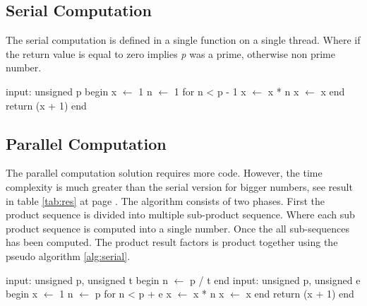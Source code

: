 \documentclass[12pt, oneside, onecolumn]{article}
\begin{document}
\subsection{Serial Computation}
The serial computation is defined in a single function on a single thread. Where if the return value is equal to zero implies \emph{p} was a prime, otherwise non prime number.
\begin{algorithm}[caption={Serial Computation.},label={alg:serial}]
input: unsigned p
begin
	x $\gets$ 1
	n $\gets$ 1
	for n < p - 1
		x $\gets$ x * n
		x $\gets$ x %
	end
	return (x + 1) %
end
\end{algorithm}

\subsection{Parallel Computation}
The parallel computation solution requires more code. However, the time complexity is much greater than the serial version for bigger numbers, see result in table \ref{tab:res} at page \pageref{tab:res}.
The algorithm consists of two phases. First the product sequence is divided into multiple sub-product sequence. Where each sub product sequence is computed into a single number. Once the all sub-sequences has been computed.
The product result factors is product together using the pseudo algorithm \ref{alg:serial}.

\begin{algorithm}[caption={Wilsom's Prime - Parallel Computation.},label={alg:parallel}]
input: unsigned p, unsigned t
begin
	n $\gets$ p / t
end
input: unsigned p, unsigned e
begin
	x $\gets$ 1
	n $\gets$ p
	for n < p + e
		x $\gets$ x * n
		x $\gets$ x %
	end
	return (x + 1) %
end
\end{algorithm}



\end{document}

